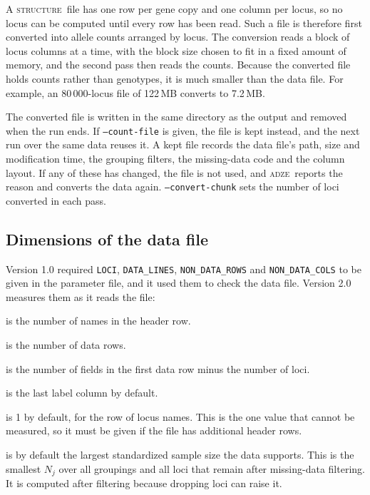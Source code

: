 \documentclass[11pt]{article}
\newcommand{\prog}{\textsc{adze}}
\newcommand{\structureprog}{\textsc{structure}}
\newcommand{\flag}[1]{\texttt{#1}}
\begin{document}
A \structureprog\ file has one row per gene copy and one column per locus, so
no locus can be computed until every row has been read. Such a file is
therefore first converted into allele counts arranged by locus. The conversion
reads a block of locus columns at a time, with the block size chosen to fit in
a fixed amount of memory, and the second pass then reads the counts. Because
the converted file holds counts rather than genotypes, it is much smaller than
the data file. For example, an 80\,000-locus file of 122\,MB converts to
7.2\,MB.

The converted file is written in the same directory as the output and removed
when the run ends. If \flag{--count-file} is given, the file is kept instead,
and the next run over the same data reuses it. A kept file records the data
file's path, size and modification time, the grouping filters, the missing-data
code and the column layout. If any of these has changed, the file is not used,
and \prog\ reports the reason and converts the data again.
\flag{--convert-chunk} sets the number of loci converted in each pass.

\subsection{Dimensions of the data file}
\label{sec:autodetect}

Version 1.0 required \texttt{LOCI}, \texttt{DATA\_LINES},
\texttt{NON\_DATA\_ROWS} and \texttt{NON\_DATA\_COLS} to be given in the
parameter file, and it used them to check the data file. Version 2.0 measures
them as it reads the file:

\begin{description}[style=nextline,leftmargin=1em]
\item[\flag{--loci}] is the number of names in the header row.
\item[\flag{--data-lines}] is the number of data rows.
\item[\flag{--non-data-cols}] is the number of fields in the first data row
  minus the number of loci.
\item[\flag{--group-col}] is the last label column by default.
\item[\flag{--non-data-rows}] is 1 by default, for the row of locus names.
  This is the one value that cannot be measured, so it must be given if the
  file has additional header rows.
\item[\flag{--max-g}] is by default the largest standardized sample size the
  data supports. This is the smallest $N_j$ over all groupings and all loci
  that remain after missing-data filtering. It is computed after filtering
  because dropping loci can raise it.
\end{description}
\end{document}
